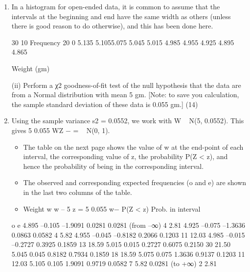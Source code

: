 \documentclass[a4paper,12pt]{article}
\begin{document}
\begin{enumerate} 
\item In a histogram for open-ended data, it is common to assume that the intervals at the beginning and end have the same width as others (unless there is good reason to do otherwise), and this has been done here. 
 
 
 
 
  
 
 
 
 
 
 
 
 
 
 
 
 
 
 
 
 
 
 
 
 
 
 30 
10 
Frequency 
20 
  0 
5.135 5.1055.075 5.045 5.015 4.985 4.955 4.925 4.895 4.865 
 
Weight (gm)  


(ii) Perform a χ2 goodness-of-fit test of the null hypothesis that the data are from a Normal distribution with mean 5 gm.  [Note:  to save you calculation, the sample standard deviation of these data is 0.055 gm.] (14) 
  
 
\item  Using the sample variance s2 = 0.0552, we work with W ~ N(5, 0.0552).  This gives 5 0.055 WZ − = ~ N(0, 1). 

\begin{itemize}
\item The table on the next page shows the value of w at the end-point of each interval, the corresponding value of z, the probability P(Z < z), and hence the probability of being in the corresponding interval.  
\item The observed and corresponding expected frequencies (o and e) are shown in the last two columns of the table. 
\item 
Weight w w – 5 z = 5 0.055 w− P(Z < z) Prob. in interval
\end{itemize}
 o e 
4.895 –0.105 –1.9091 0.0281 0.0281 (from –∞)   4   2.81 4.925 –0.075 –1.3636 0.0863 0.0582    4   5.82 4.955 –0.045 –0.8182 0.2066 0.1203  11 12.03 4.985 –0.015 –0.2727 0.3925 0.1859  13 18.59 5.015   0.015   0.2727 0.6075 0.2150  30 21.50 5.045   0.045   0.8182 0.7934 0.1859  18 18.59 5.075   0.075   1.3636 0.9137 0.1203  11 12.03 5.105   0.105   1.9091 0.9719 0.0582    7   5.82     0.0281 (to +∞)   2   2.81 
 

\end{enumerate}
\end{document}
